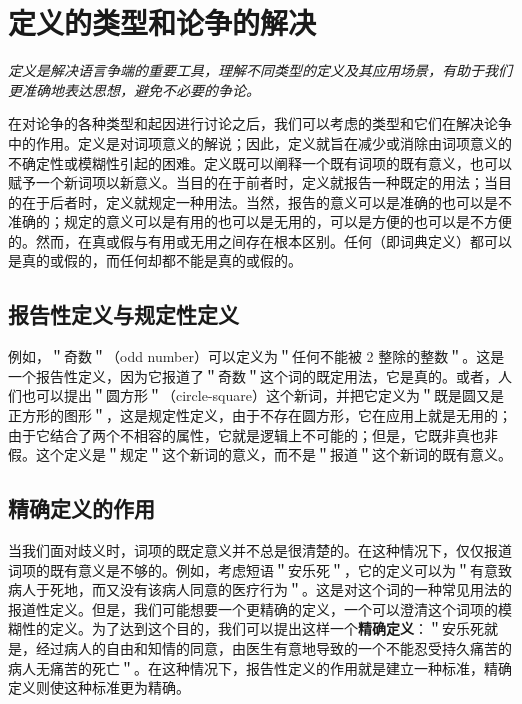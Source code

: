 \section{定义的类型和论争的解决}

\begin{logicbox}[title=引言]
\textit{定义是解决语言争端的重要工具，理解不同类型的定义及其应用场景，有助于我们更准确地表达思想，避免不必要的争论。}
\end{logicbox}

在对论争的各种类型和起因进行讨论之后，我们可以考虑的类型和它们在解决论争中的作用。定义是对词项意义的解说；因此，定义就旨在减少或消除由词项意义的不确定性或模糊性引起的困难。定义既可以阐释一个既有词项的既有意义，也可以赋予一个新词项以新意义。当目的在于前者时，定义就报告一种既定的用法；当目的在于后者时，定义就规定一种用法。当然，报告的意义可以是准确的也可以是不准确的；规定的意义可以是有用的也可以是无用的，可以是方便的也可以是不方便的。然而，在真或假与有用或无用之间存在根本区别。任何（即词典定义）都可以是真的或假的，而任何却都不能是真的或假的。

\subsection{报告性定义与规定性定义}

例如，＂奇数＂（odd number）可以定义为＂任何不能被 2 整除的整数＂。这是一个报告性定义，因为它报道了＂奇数＂这个词的既定用法，它是真的。或者，人们也可以提出＂圆方形＂（circle-square）这个新词，并把它定义为＂既是圆又是正方形的图形＂，这是规定性定义，由于不存在圆方形，它在应用上就是无用的；由于它结合了两个不相容的属性，它就是逻辑上不可能的；但是，它既非真也非假。这个定义是＂规定＂这个新词的意义，而不是＂报道＂这个新词的既有意义。

\subsection{精确定义的作用}

当我们面对歧义时，词项的既定意义并不总是很清楚的。在这种情况下，仅仅报道词项的既有意义是不够的。例如，考虑短语＂安乐死＂，它的定义可以为＂有意致病人于死地，而又没有该病人同意的医疗行为＂。这是对这个词的一种常见用法的报道性定义。但是，我们可能想要一个更精确的定义，一个可以澄清这个词项的模糊性的定义。为了达到这个目的，我们可以提出这样一个\textbf{精确定义}：＂安乐死就是，经过病人的自由和知情的同意，由医生有意地导致的一个不能忍受持久痛苦的病人无痛苦的死亡＂。在这种情况下，报告性定义的作用就是建立一种标准，精确定义则使这种标准更为精确。

